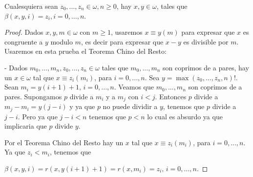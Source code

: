   \begin{lemma} \label{lemma_114}
    \PN Cualesquiera sean $z_{0}, \dotsc, z_{n} \in \omega, n \geq 0$, hay $x, y \in \omega$, tales que $\beta(x, y, i)
    = z_{i}, i = 0, \dotsc, n$.
  \end{lemma}
  \begin{proof}
    Dados $x,y,m\in \omega $ con $m\geq 1$, usaremos $x\equiv y(m)$ para expresar que $x$ es congruente a $y$ modulo $m$, es decir para expresar que $ x-y$ es divisible por $m$. Usaremos en esta prueba el Teorema Chino del Resto:

    - Dados $m_{0},...,m_{n},z_{0},...,z_{n}\in \omega $ tales que $ m_{0},...,m_{n}$ son coprimos de a pares, hay un $x\in \omega $ tal que $ x\equiv z_{i}(m_{i})$, para $i=0,...,n.$
    Sea $y=\max (z_{0},...,z_{n},n)!$. Sean $m_{i}=y(i+1)+1$, $i=0,...,n$. Veamos que $m_{0},...,m_{n}$ son coprimos de a pares. Supongamos $p$ divide a $m_{i}$ y a $m_{j}$ con $i< j$. Entonces $p$ divide a $m_{j}-m_{i}=y(j-i)$ y ya que $p$ no puede dividir a $y$, tenemos que $p$ divide a $j-i$. Pero ya que $j-i< n$ tenemos que $p< n$ lo cual es absurdo ya que implicaria que $p$ divide $y$.

    Por el Teorema Chino del Resto hay un $x$ tal que $x\equiv z_{i}(m_{i})$, para $i=0,...,n$. Ya que $z_{i}< m_{i}$, tenemos que

    $\displaystyle \beta (x,y,i)=r(x,y(i+1)+1)=r(x,m_{i})=z_{i}\text{, }i=0,...,n\text{.} $
  \end{proof}

